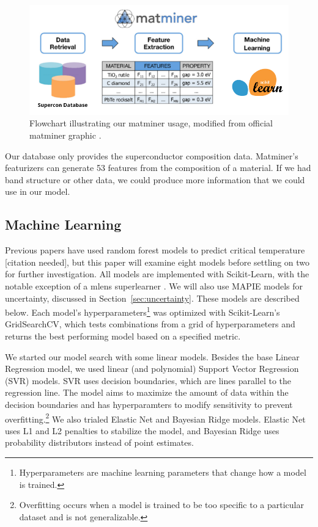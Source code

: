 \documentclass[twocolumn, nofootinbib, secnumarabic, amssymb, nobibnotes, aps, prd]{revtex4-2}
\begin{document}
\begin{figure}[!htb]
   \centering
   \includegraphics[scale=0.25]{flowchart.png}
   \caption{Flowchart illustrating our matminer usage, modified from official matminer graphic \cite{WARD201860}.}
   \label{fig:matminer-flowchart}
\end{figure}

Our database only provides the superconductor composition data. Matminer's featurizers can generate 53 features from the composition of a material. If we had band structure or other data, we could produce more information that we could use in our model.

\subsection{Machine Learning}
Previous papers have used random forest models to predict critical temperature [citation needed], but this paper will examine eight models before settling on two for further investigation. All models are implemented with Scikit-Learn, with the notable exception of a mlens superlearner \cite{scikit-learn, flennerhag:2017mlens}. We will also use MAPIE models for uncertainty, discussed in Section~\ref{sec:uncertainty}. These models are described below. Each model's hyperparameters\footnote{Hyperparameters are machine learning parameters that change how a model is trained.} was optimized with Scikit-Learn's GridSearchCV, which tests combinations from a grid of hyperparameters and returns the best performing model based on a specified metric. 

We started our model search with some linear models. Besides the base Linear Regression model, we used linear (and polynomial) Support Vector Regression (SVR) models. SVR uses decision boundaries, which are lines parallel to the regression line. The model aims to maximize the amount of data within the decision boundaries and has hyperparamters to modify sensitivity to prevent overfitting.\footnote{Overfitting occurs when a model is trained to be too specific to a particular dataset and is not generalizable.} We also trialed Elastic Net and Bayesian Ridge models. Elastic Net uses L1 and L2 penalties to stabilize the model, and Bayesian Ridge uses probability distributors instead of point estimates.
\end{document}
